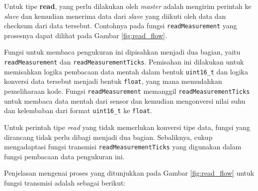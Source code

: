         Untuk tipe \textbf{read}, yang perlu dilakukan oleh \textit{master} adalah mengirim perintah ke \textit{slave} dan kemudian menerima data dari \textit{slave} yang diikuti oleh data dan checksum dari data tersebut. Contohnya pada fungsi \texttt{readMeasurement} yang prosesnya dapat dilihat pada Gambar \ref{fig:read_flow}.

        Fungsi untuk membaca pengukuran ini dipisahkan menjadi dua bagian, yaitu \texttt{readMeasurement} dan \texttt{readMeasurementTicks}. Pemisahan ini dilakukan untuk memisahkan logika pembacaan data mentah dalam bentuk \texttt{uint16\_t} dan logika konversi data tersebut menjadi bentuk \texttt{float}, yang mana memudahkan pemeliharaan kode. Fungsi \texttt{readMeasurement} memanggil \texttt{readMeasurementTicks} untuk membaca data mentah dari sensor dan kemudian mengonversi nilai suhu dan kelembaban dari format \texttt{uint16\_t} ke \texttt{float}. 

        Untuk perintah tipe \textit{read} yang tidak memerlukan konversi tipe data, fungsi yang dirancang tidak perlu dibagi menjadi dua bagian. Sebaliknya, cukup mengadaptasi fungsi transmisi \texttt{readMeasurementTicks} yang digunakan dalam fungsi pembacaan data pengukuran ini.

        Penjelasan mengenai proses yang ditunjukkan pada Gambar \ref{fig:read_flow} untuk fungsi transmisi adalah sebagai berikut:

